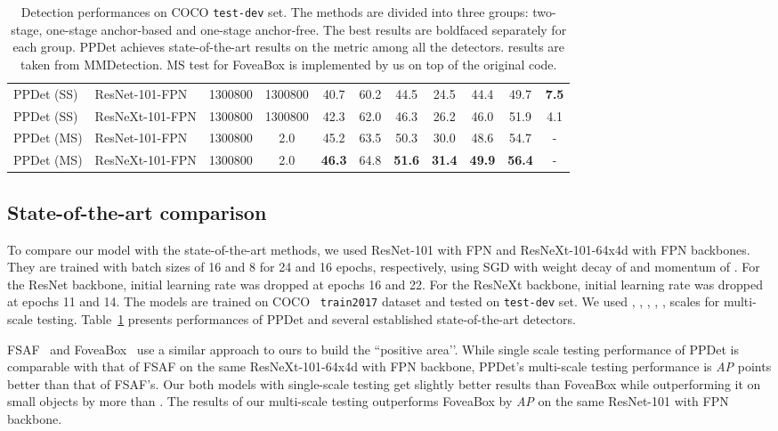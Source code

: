 \documentclass{bmvc2k}
\begin{document}
\begin{table}[H]
{\begin{tabular}{llccccccccc}
\midrule PPDet (SS) & ResNet-101-FPN & 1300800 & 1300800 &  40.7 &   60.2 &   44.5 & 24.5 &  44.4 & 49.7 & \textbf{7.5}  \\
PPDet (SS) & ResNeXt-101-FPN & 1300800 & 1300800 &  42.3 &   62.0 &   46.3 & 26.2 &  46.0 & 51.9 & 4.1 \\
PPDet (MS) & ResNet-101-FPN & 1300800 & 2.0 & 45.2 & 63.5 &   50.3 & 30.0 &  48.6 & 54.7 & - \\
PPDet (MS) & ResNeXt-101-FPN & 1300800 & 2.0 & \textbf{46.3} &  64.8 &  \textbf{51.6} & \textbf{31.4} &  \textbf{49.9} & \textbf{56.4} & - \\
  \bottomrule \end{tabular}}
\caption{Detection performances on COCO \texttt{test-dev} set. The methods are divided into three groups: two-stage, one-stage anchor-based and one-stage anchor-free. The best results are boldfaced separately for each group. PPDet achieves state-of-the-art results on the  metric among all the detectors.  results are taken from MMDetection.  MS test for FoveaBox is implemented by us on top of the original code.}
\label{table:stateoftheartcomp}
\end{table}







\subsection{State-of-the-art comparison}
To compare our model with the state-of-the-art methods, we used ResNet-101 with FPN and ResNeXt-101-64x4d with FPN backbones. They are trained with batch sizes of 16 and 8 for 24 and 16 epochs, respectively, using SGD with weight decay of  and momentum of . For the ResNet backbone, initial learning rate  was dropped  at epochs 16 and 22. For the ResNeXt backbone, initial learning rate  was dropped  at epochs 11 and 14. The models are trained on COCO~\cite{mscoco} \texttt{train2017} dataset and tested on \texttt{test-dev} set. We used , , , , ,   scales for multi-scale testing. 
Table~\ref{table:stateoftheartcomp} presents performances of PPDet and several established state-of-the-art detectors. 


FSAF~\cite{fsaf} and FoveaBox~\cite{foveabox} use a similar approach to ours to build the ``positive area’’. While single scale testing performance of PPDet  is  comparable with that of FSAF on the same  ResNeXt-101-64x4d with FPN backbone,  PPDet’s multi-scale testing performance is  \textit{AP} points better than that of FSAF’s. Our both models with single-scale testing get slightly better results than FoveaBox while outperforming it on small objects by more than .  The results of our multi-scale testing outperforms FoveaBox by  \textit{AP} on the same ResNet-101 with FPN backbone. 
\end{document}

